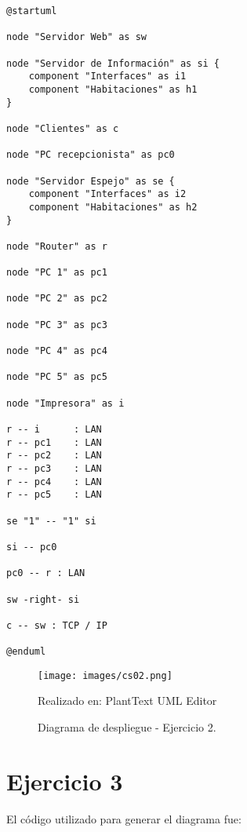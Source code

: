 \documentclass[a4paper,12pt]{article}
\begin{document}
\begin{lstlisting}
@startuml

node "Servidor Web" as sw

node "Servidor de Información" as si {
    component "Interfaces" as i1
    component "Habitaciones" as h1
}

node "Clientes" as c

node "PC recepcionista" as pc0

node "Servidor Espejo" as se {
    component "Interfaces" as i2
    component "Habitaciones" as h2
}

node "Router" as r

node "PC 1" as pc1

node "PC 2" as pc2

node "PC 3" as pc3

node "PC 4" as pc4

node "PC 5" as pc5

node "Impresora" as i

r -- i      : LAN
r -- pc1    : LAN
r -- pc2    : LAN
r -- pc3    : LAN
r -- pc4    : LAN
r -- pc5    : LAN

se "1" -- "1" si

si -- pc0

pc0 -- r : LAN

sw -right- si

c -- sw : TCP / IP

@enduml
\end{lstlisting}

\clearpage
\newpage

\begin{figure}[ht]
        \centering        
        \texttt{[image: images/cs02.png]}
        \caption{Diagrama de despliegue - Ejercicio 2.}  
        {{\footnotesize Realizado en: PlantText UML Editor }}
\end{figure}

\section*{Ejercicio 3}

El código utilizado para generar el diagrama fue:
\end{document}
